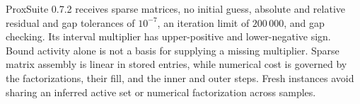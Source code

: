 ProxSuite 0.7.2 receives sparse matrices, no initial guess, absolute
and relative residual and gap tolerances of \(10^{-7}\), an iteration
limit of \(200\,000\), and gap checking. Its interval multiplier has
upper-positive and lower-negative sign. Bound activity alone is not a
basis for supplying a missing multiplier. Sparse matrix assembly is
linear in stored entries, while numerical cost is governed by the
factorizations, their fill, and the inner and outer steps. Fresh
instances avoid sharing an inferred active set or numerical
factorization across samples.
